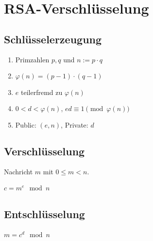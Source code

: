 \section*{RSA-Verschlüsselung}

\subsection*{Schlüsselerzeugung}
\begin{enumerate}
	\item Primzahlen $p,q$ und $n := p \cdot q$
	\item $\varphi(n) = (p-1)\cdot(q-1)$
	\item $e$ teilerfremd zu $\varphi(n)$
	\item $0<d<\varphi(n)$, $ed \equiv 1 \pmod{\varphi(n)}$
	\item Public: $(e,n)$, Private: $d$
\end{enumerate}

\subsection*{Verschlüsselung}
Nachricht $m$ mit $0 \le m < n$.

$c = m^e \mod n$

\subsection*{Entschlüsselung}
$m = c^d \mod n$
